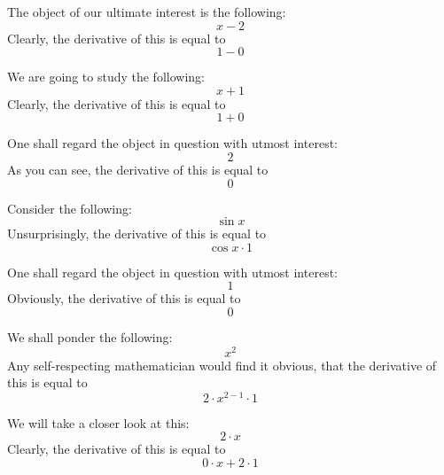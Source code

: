 \documentclass{article}
\begin{document}
The object of our ultimate interest is the following:
\begin{equation}
x - 2 
\end{equation}
Clearly, the derivative of this is equal to
\begin{equation}
1 - 0 
\end{equation}

We are going to study the following:
\begin{equation}
x + 1 
\end{equation}
Clearly, the derivative of this is equal to
\begin{equation}
1 + 0 
\end{equation}

One shall regard the object in question with utmost interest:
\begin{equation}
2 
\end{equation}
As you can see, the derivative of this is equal to
\begin{equation}
0 
\end{equation}

Consider the following:
\begin{equation}
\sin x 
\end{equation}
Unsurprisingly, the derivative of this is equal to
\begin{equation}
\cos x \cdot 1 
\end{equation}

One shall regard the object in question with utmost interest:
\begin{equation}
1 
\end{equation}
Obviously, the derivative of this is equal to
\begin{equation}
0 
\end{equation}

We shall ponder the following:
\begin{equation}
x ^{2 } 
\end{equation}
Any self-respecting mathematician would find it obvious, that the derivative of this is equal to
\begin{equation}
2 \cdot x ^{2 - 1 } \cdot 1 
\end{equation}

We will take a closer look at this:
\begin{equation}
2 \cdot x 
\end{equation}
Clearly, the derivative of this is equal to
\begin{equation}
0 \cdot x + 2 \cdot 1 
\end{equation}
\end{document}
